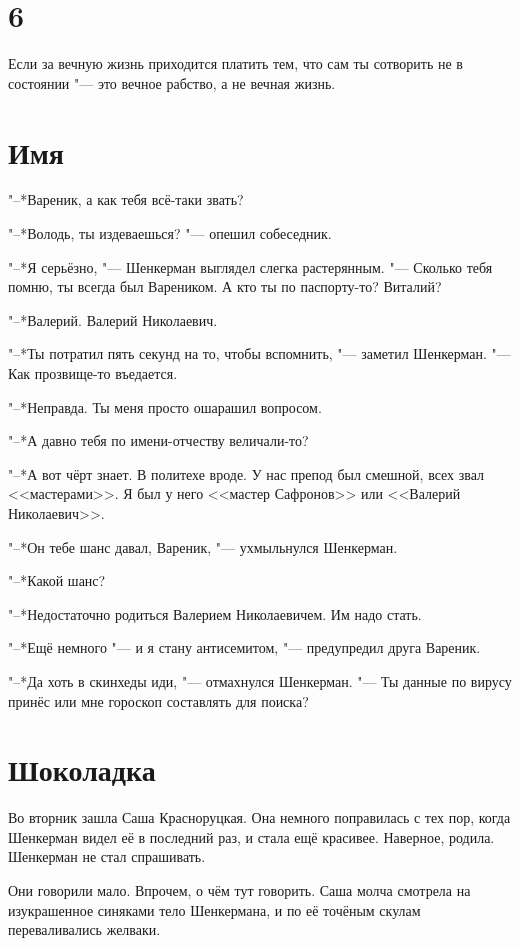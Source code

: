 \section{6}

Если за вечную жизнь приходится платить тем, что сам ты сотворить не в состоянии "--- это вечное рабство, а не вечная жизнь.

\section{Имя}

"--*Вареник, а как тебя всё-таки звать?

"--*Володь, ты издеваешься? "--- опешил собеседник.

"--*Я серьёзно, "--- Шенкерман выглядел слегка растерянным.
"--- Сколько тебя помню, ты всегда был Вареником.
А кто ты по паспорту-то?
Виталий?

"--*Валерий.
Валерий Николаевич.

"--*Ты потратил пять секунд на то, чтобы вспомнить, "--- заметил Шенкерман.
"--- Как прозвище-то въедается.

"--*Неправда.
Ты меня просто ошарашил вопросом.

"--*А давно тебя по имени-отчеству величали-то?

"--*А вот чёрт знает.
В политехе вроде.
У нас препод был смешной, всех звал <<мастерами>>.
Я был у него <<мастер Сафронов>> или <<Валерий Николаевич>>.

"--*Он тебе шанс давал, Вареник, "--- ухмыльнулся Шенкерман.

"--*Какой шанс?

"--*Недостаточно родиться Валерием Николаевичем.
Им надо стать.

"--*Ещё немного "--- и я стану антисемитом, "--- предупредил друга Вареник.

"--*Да хоть в скинхеды иди, "--- отмахнулся Шенкерман.
"--- Ты данные по вирусу принёс или мне гороскоп составлять для поиска?

\section{Шоколадка}

Во вторник зашла Саша Красноруцкая.
Она немного поправилась с тех пор, когда Шенкерман видел её в последний раз, и стала ещё красивее.
Наверное, родила.
Шенкерман не стал спрашивать.

Они говорили мало.
Впрочем, о чём тут говорить.
Саша молча смотрела на изукрашенное синяками тело Шенкермана, и по её точёным скулам переваливались желваки.

